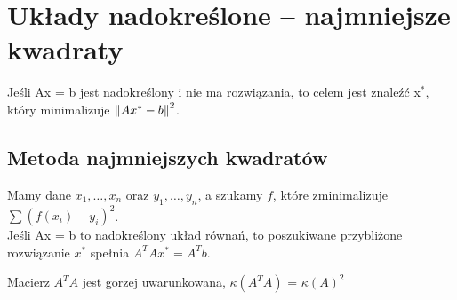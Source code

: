 \section{Układy nadokreślone – najmniejsze kwadraty}
Jeśli Ax = b jest nadokreślony i nie ma rozwiązania, to celem jest znaleźć x\( ^* \), który minimalizuje \( \left\Vert Ax^* - b \right\Vert^2 \).

\subsection{Metoda najmniejszych kwadratów}
Mamy dane \( x_1, \dots, x_n \) oraz \( y_1, \dots, y_n \), a szukamy \( f \), które zminimalizuje \( \sum (f(x_i) - y_i)^2 \). \\
Jeśli Ax = b to nadokreślony układ równań, to poszukiwane przybliżone rozwiązanie \( x^* \) spełnia \( A^TAx^* = A^Tb \). \\
\begin{warning}
	Macierz \( A^TA \) jest gorzej uwarunkowana, \( \kappa(A^TA) \) = \( \kappa(A)^2 \)
\end{warning}